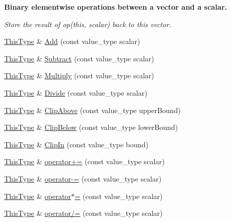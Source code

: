 \begin{Indent}{\bf Binary elementwise operations between a vector and a scalar.}\par
{\em Store the result of op(this, scalar) back to this vector. }\begin{DoxyCompactItemize}
\item 
\hyperlink{classvct_dynamic_const_vector_base_a39da273523717f678f54d3321ebca3dd}{This\-Type} \& \hyperlink{classvct_dynamic_vector_base_ac5fd1fdbda2f81924cbbf4de056e5435}{Add} (const value\-\_\-type scalar)
\item 
\hyperlink{classvct_dynamic_const_vector_base_a39da273523717f678f54d3321ebca3dd}{This\-Type} \& \hyperlink{classvct_dynamic_vector_base_a2d860076420a521f60caad0470f21bdb}{Subtract} (const value\-\_\-type scalar)
\item 
\hyperlink{classvct_dynamic_const_vector_base_a39da273523717f678f54d3321ebca3dd}{This\-Type} \& \hyperlink{classvct_dynamic_vector_base_aafb96cc6707729560680238849f6cf02}{Multiply} (const value\-\_\-type scalar)
\item 
\hyperlink{classvct_dynamic_const_vector_base_a39da273523717f678f54d3321ebca3dd}{This\-Type} \& \hyperlink{classvct_dynamic_vector_base_a4716f1b6eb5b3373f023c77c775abace}{Divide} (const value\-\_\-type scalar)
\item 
\hyperlink{classvct_dynamic_const_vector_base_a39da273523717f678f54d3321ebca3dd}{This\-Type} \& \hyperlink{classvct_dynamic_vector_base_acb2e769ff0f70bbce2e45d549f8a23c0}{Clip\-Above} (const value\-\_\-type upper\-Bound)
\item 
\hyperlink{classvct_dynamic_const_vector_base_a39da273523717f678f54d3321ebca3dd}{This\-Type} \& \hyperlink{classvct_dynamic_vector_base_af73430126994c263c1169837a9c9c58d}{Clip\-Below} (const value\-\_\-type lower\-Bound)
\item 
\hyperlink{classvct_dynamic_const_vector_base_a39da273523717f678f54d3321ebca3dd}{This\-Type} \& \hyperlink{classvct_dynamic_vector_base_a5e3a219ac2bf358961fb67ec48639d6c}{Clip\-In} (const value\-\_\-type bound)
\item 
\hyperlink{classvct_dynamic_const_vector_base_a39da273523717f678f54d3321ebca3dd}{This\-Type} \& \hyperlink{classvct_dynamic_vector_base_a6a60f395f89f628e44566c6d574e9579}{operator+=} (const value\-\_\-type scalar)
\item 
\hyperlink{classvct_dynamic_const_vector_base_a39da273523717f678f54d3321ebca3dd}{This\-Type} \& \hyperlink{classvct_dynamic_vector_base_a00d36e2c3d0443099567cbe840af0821}{operator-\/=} (const value\-\_\-type scalar)
\item 
\hyperlink{classvct_dynamic_const_vector_base_a39da273523717f678f54d3321ebca3dd}{This\-Type} \& \hyperlink{classvct_dynamic_vector_base_a955c825c03c72580f33a605e8075ffb2}{operator$\ast$=} (const value\-\_\-type scalar)
\item 
\hyperlink{classvct_dynamic_const_vector_base_a39da273523717f678f54d3321ebca3dd}{This\-Type} \& \hyperlink{classvct_dynamic_vector_base_a273990280eeaaaab279fb696650d1e7f}{operator/=} (const value\-\_\-type scalar)
\end{DoxyCompactItemize}
\end{Indent}
